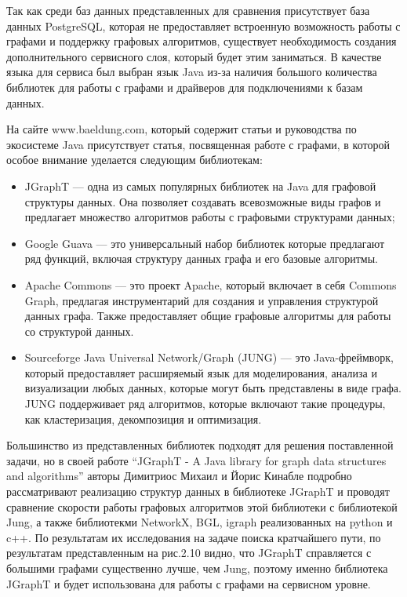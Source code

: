 Так как среди баз данных представленных для сравнения присутствует база данных PostgreSQL, которая не предоставляет встроенную возможность
работы с графами и поддержку графовых алгоритмов, существует необходимость создания дополнительного сервисного слоя, который будет этим
заниматься. В качестве языка для сервиса был выбран язык Java из-за наличия большого количества библиотек для работы с графами и драйверов
для подключениями к базам данных.

На сайте www.baeldung.com, который содержит статьи и руководства по экосистеме Java присутствует статья, посвященная работе с графами, в
которой особое внимание уделается следующим библиотекам:

\begin{itemize}
    \item JGraphT — одна из самых популярных библиотек на Java для графовой структуры данных. Она позволяет создавать всевозможные виды графов и предлагает множество алгоритмов работы с графовыми структурами данных;
    \item Google Guava — это универсальный набор библиотек которые предлагают ряд функций, включая структуру данных графа и его базовые алгоритмы.
    \item Apache Commons — это проект Apache, который включает в себя Commons Graph, предлагая инструментарий для создания и управления структурой данных графа. Также предоставляет общие графовые алгоритмы для работы со структурой данных.
    \item Sourceforge Java Universal Network/Graph (JUNG) — это Java-фреймворк, который предоставляет расширяемый язык для моделирования, анализа и визуализации любых данных, которые могут быть представлены в виде графа. JUNG поддерживает ряд алгоритмов, которые включают такие процедуры, как кластеризация, декомпозиция и оптимизация.
\end{itemize}

Большинство из представленных библиотек подходят для решения поставленной задачи, но в своей работе “JGraphT - A Java library for graph
data structures and algorithms” авторы Димитриос Михаил и Йорис Кинабле подробно рассматривают реализацию структур данных в библиотеке
JGraphT и проводят сравнение скорости работы графовых алгоритмов этой библиотеки с библиотекой Jung, а также библиотекми NetworkX, BGL,
igraph реализованных на python и c++. По результатам их исследования на задаче поиска кратчайшего пути, по результатам представленным
на рис.2.10 видно, что JGraphT справляется с большими графами существенно лучше, чем Jung, поэтому именно библиотека JGraphT и будет
использована для работы с графами на сервисном уровне.

